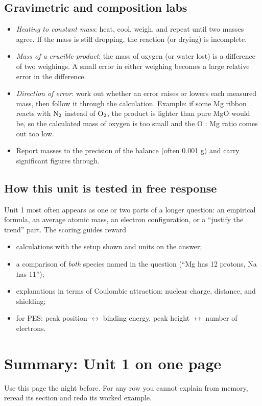 \documentclass[11pt]{article}
\begin{document}
\subsection{Gravimetric and composition labs}
\begin{itemize}
\item \emph{Heating to constant mass}: heat, cool, weigh, and repeat until two masses agree. If the mass is still dropping, the reaction (or drying) is incomplete.
\item \emph{Mass of a crucible product}: the mass of oxygen (or water lost) is a difference of two weighings. A small error in either weighing becomes a large relative error in the difference.
\item \emph{Direction of error}: work out whether an error raises or lowers each measured mass, then follow it through the calculation. Example: if some Mg ribbon reacts with $\ce{N2}$ instead of $\ce{O2}$, the product is lighter than pure MgO would be, so the calculated mass of oxygen is too small and the O : Mg ratio comes out too low.
\item Report masses to the precision of the balance (often 0.001 g) and carry significant figures through.
\end{itemize}

\subsection{How this unit is tested in free response}
Unit 1 most often appears as one or two parts of a longer question: an empirical formula, an average atomic mass, an electron configuration, or a ``justify the trend'' part. The scoring guides reward
\begin{itemize}
\item calculations with the setup shown and units on the answer;
\item a comparison of \emph{both} species named in the question (``Mg has 12 protons, Na has 11'');
\item explanations in terms of Coulombic attraction: nuclear charge, distance, and shielding;
\item for PES: peak position $\leftrightarrow$ binding energy, peak height $\leftrightarrow$ number of electrons.
\end{itemize}

\clearpage
\section*{Summary: Unit 1 on one page}
Use this page the night before. For any row you cannot explain from memory, reread its section and redo its worked example.
\end{document}
